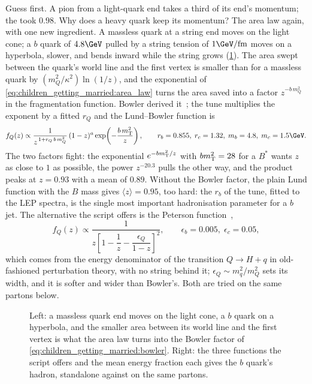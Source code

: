 Guess first. A pion from a light-quark end takes a third of its end's
momentum; the \Bstarbar took $0.98$. Why does a heavy quark keep its
momentum? The area law again, with one new ingredient. A massless quark at
a string end moves on the light cone; a $b$ quark of $4.8\GeV$ pulled by a
string tension of $1\GeV/\mathrm{fm}$ moves on a hyperbola, slower, and
bends inward while the string grows (\cref{fig:children_getting_married:bowler_sketch}).
The area swept between the quark's world line and the first vertex is
smaller than for a massless quark by $(m_Q^2/\kappa^2)\ln(1/z)$, and the
exponential of \cref{eq:children_getting_married:area_law} turns the area
saved into a factor $z^{-b\,m_Q^2}$ in the fragmentation function. Bowler derived
it~\cite{Bowler:1981sb}; the tune multiplies the exponent by a fitted
$r_Q$ and the Lund--Bowler function is
\begin{equation}
  f_Q(z)\propto\frac{1}{z^{\,1+r_Q\,b\,m_Q^2}}\,(1-z)^a\exp\!\left(-\frac{b\,\mT^2}{z}\right),
  \qquad r_b=0.855,\; r_c=1.32,\; m_b=4.8,\; m_c=1.5\GeV.
  \label{eq:children_getting_married:bowler}
\end{equation}
The two factors fight: the exponential $e^{-bm_{\mathrm{T}}^2/z}$ with $bm_{\mathrm{T}}^2=28$ for
a $B^*$ wants $z$ as close to $1$ as possible, the power $z^{-20.3}$ pulls
the other way, and the product peaks at $z=0.93$ with a mean of $0.89$.
Without the Bowler factor, the plain Lund function with the $B$ mass gives
$\langle z\rangle=0.95$, too hard: the $r_b$ of the tune, fitted to the LEP
spectra, is the single most important hadronisation parameter for a $b$
jet. The alternative the script offers is the Peterson
function~\cite{Peterson:1982ak},
\begin{equation}
  f_Q(z)\propto\frac{1}{z\left[1-\dfrac1z-\dfrac{\epsilon_Q}{1-z}\right]^2},
  \qquad \epsilon_b=0.005,\;\epsilon_c=0.05,
  \label{eq:children_getting_married:peterson}
\end{equation}
which comes from the energy denominator of the transition
$Q\to H+q$ in old-fashioned perturbation theory, with no string behind it;
$\epsilon_Q\sim m_q^2/m_Q^2$ sets its width, and it is softer and wider
than Bowler's. Both are tried on the same partons below.

\begin{figure}[htbp]\centering
\resizebox{\textwidth}{!}{}
\caption[The heavy end of the string and the three fragmentation
functions]{Left: a massless quark end moves on the light cone, a $b$ quark
on a hyperbola, and the smaller area between its world line and the first
vertex is what the area law turns into the Bowler factor of
\cref{eq:children_getting_married:bowler}. Right: the three functions the
script offers and the mean energy fraction each gives the $b$ quark's
hadron, standalone against \PYTHIA on the same partons.}
\label{fig:children_getting_married:bowler_sketch}
\end{figure}

